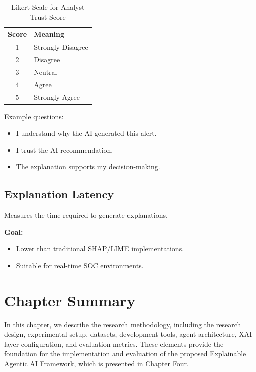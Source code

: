 \documentclass[12pt,a4paper]{report}
\begin{document}
\begin{table}[h!]
\centering
\caption{Likert Scale for Analyst Trust Score}
\label{tab:likert}
\begin{tabular}{|c|l|}
\hline
\textbf{Score} & \textbf{Meaning} \\
\hline
1 & Strongly Disagree \\
\hline
2 & Disagree \\
\hline
3 & Neutral \\
\hline
4 & Agree \\
\hline
5 & Strongly Agree \\
\hline
\end{tabular}
\end{table}

Example questions:
\begin{itemize}
    \item I understand why the AI generated this alert.
    \item I trust the AI recommendation.
    \item The explanation supports my decision-making.
\end{itemize}

\subsection{Explanation Latency}
Measures the time required to generate explanations.

\textbf{Goal:}
\begin{itemize}
    \item Lower than traditional SHAP/LIME implementations.
    \item Suitable for real-time SOC environments.
\end{itemize}

\section{Chapter Summary}
\label{sec:chapter_summary}

In this chapter, we describe the research methodology, including the research design, experimental setup, datasets, development tools, agent architecture, XAI layer configuration, and evaluation metrics. These elements provide the foundation for the implementation and evaluation of the proposed Explainable Agentic AI Framework, which is presented in Chapter Four.

\end{document}
